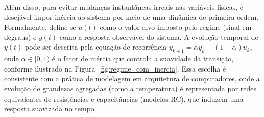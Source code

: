 Além disso, para evitar mudanças instantâneas irreais nas variáveis físicas, é desejável impor inércia ao sistema por meio de uma dinâmica de primeira ordem. Formalmente, define-se $u(t)$ como o valor alvo imposto pelo regime (sinal em degraus) e $y(t)$ como a resposta observável do sistema. A evolução temporal de $y(t)$ pode ser descrita pela equação de recorrência $y_{k+1} = \alpha y_k + (1-\alpha)u_k$, onde $\alpha \in [0,1)$ é o fator de inércia que controla a suavidade da transição, conforme ilustrado na Figura~\ref{fig:regime_com_inercia}. Essa escolha é consistente com a prática de modelagem em arquitetura de computadores, onde a evolução de grandezas agregadas (como a temperatura) é representada por redes equivalentes de resistências e capacitâncias (modelos RC), que induzem uma resposta suavizada no tempo~\cite{skadron2003hotspot}.

